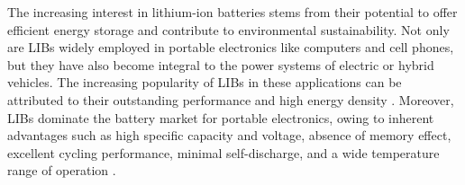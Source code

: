 The increasing interest in lithium-ion batteries stems from their potential to offer efficient energy storage and contribute to environmental sustainability. Not only are LIBs widely employed in portable electronics like computers and cell phones, but they have also become integral to the power systems of electric or hybrid vehicles. The increasing popularity of LIBs in these applications can be attributed to their outstanding performance and high energy density \cite{kang2020binder}. Moreover, LIBs dominate the battery market for portable electronics, owing to inherent advantages such as high specific capacity and voltage, absence of memory effect, excellent cycling performance, minimal self-discharge, and a wide temperature range of operation \cite{zubi2018lithium}.

\vspace{5mm}

